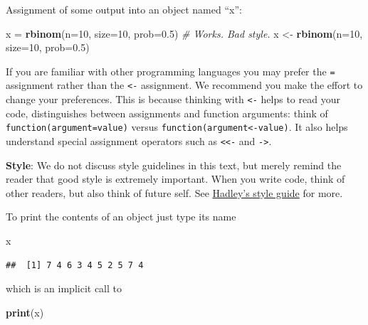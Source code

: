 \documentclass[]{book}
\newenvironment{Shaded}{\begin{snugshade}}{\end{snugshade}}
\newcommand{\KeywordTok}[1]{\textcolor[rgb]{0.13,0.29,0.53}{\textbf{#1}}}
\newcommand{\DataTypeTok}[1]{\textcolor[rgb]{0.13,0.29,0.53}{#1}}
\newcommand{\DecValTok}[1]{\textcolor[rgb]{0.00,0.00,0.81}{#1}}
\newcommand{\FloatTok}[1]{\textcolor[rgb]{0.00,0.00,0.81}{#1}}
\newcommand{\StringTok}[1]{\textcolor[rgb]{0.31,0.60,0.02}{#1}}
\newcommand{\CommentTok}[1]{\textcolor[rgb]{0.56,0.35,0.01}{\textit{#1}}}
\newcommand{\NormalTok}[1]{#1}
\theoremstyle{definition}
\theoremstyle{definition}
\theoremstyle{definition}
\theoremstyle{remark}
\let\BeginKnitrBlock\begin \let\EndKnitrBlock\end
\begin{document}
Assignment of some output into an object named ``x'':

\begin{Shaded}
\begin{Highlighting}[]
\NormalTok{x =}\StringTok{ }\KeywordTok{rbinom}\NormalTok{(}\DataTypeTok{n=}\DecValTok{10}\NormalTok{, }\DataTypeTok{size=}\DecValTok{10}\NormalTok{, }\DataTypeTok{prob=}\FloatTok{0.5}\NormalTok{) }\CommentTok{# Works. Bad style.}
\NormalTok{x <-}\StringTok{ }\KeywordTok{rbinom}\NormalTok{(}\DataTypeTok{n=}\DecValTok{10}\NormalTok{, }\DataTypeTok{size=}\DecValTok{10}\NormalTok{, }\DataTypeTok{prob=}\FloatTok{0.5}\NormalTok{) }
\end{Highlighting}
\end{Shaded}

If you are familiar with other programming languages you may prefer the
\texttt{=} assignment rather than the \texttt{\textless{}-} assignment.
We recommend you make the effort to change your preferences. This is
because thinking with \texttt{\textless{}-} helps to read your code,
distinguishes between assignments and function arguments: think of
\texttt{function(argument=value)} versus
\texttt{function(argument\textless{}-value)}. It also helps understand
special assignment operators such as \texttt{\textless{}\textless{}-}
and \texttt{-\textgreater{}}.

\BeginKnitrBlock{remark}
{}\textbf{Style}: We do not discuss style
guidelines in this text, but merely remind the reader that good style is
extremely important. When you write code, think of other readers, but
also think of future self. See
\href{http://adv-r.had.co.nz/Style.html}{Hadley's style guide} for more.
\EndKnitrBlock{remark}

To print the contents of an object just type its name

\begin{Shaded}
\begin{Highlighting}[]
\NormalTok{x}
\end{Highlighting}
\end{Shaded}

\begin{verbatim}
##  [1] 7 4 6 3 4 5 2 5 7 4
\end{verbatim}

which is an implicit call to

\begin{Shaded}
\begin{Highlighting}[]
\KeywordTok{print}\NormalTok{(x)  }
\end{Highlighting}
\end{Shaded}
\end{document}
